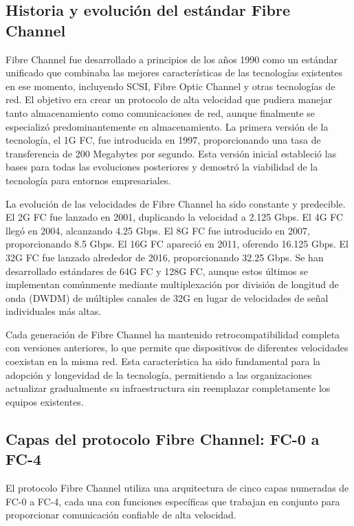 \subsection{Historia y evolución del estándar Fibre Channel}

Fibre Channel fue desarrollado a principios de los años 1990 como un estándar unificado que combinaba las mejores características de las tecnologías existentes en ese momento, incluyendo SCSI, Fibre Optic Channel y otras tecnologías de red. El objetivo era crear un protocolo de alta velocidad que pudiera manejar tanto almacenamiento como comunicaciones de red, aunque finalmente se especializó predominantemente en almacenamiento. La primera versión de la tecnología, el 1G FC, fue introducida en 1997, proporcionando una tasa de transferencia de 200 Megabytes por segundo. Esta versión inicial estableció las bases para todas las evoluciones posteriores y demostró la viabilidad de la tecnología para entornos empresariales.

La evolución de las velocidades de Fibre Channel ha sido constante y predecible. El 2G FC fue lanzado en 2001, duplicando la velocidad a 2.125 Gbps. El 4G FC llegó en 2004, alcanzando 4.25 Gbps. El 8G FC fue introducido en 2007, proporcionando 8.5 Gbps. El 16G FC apareció en 2011, oferendo 16.125 Gbps. El 32G FC fue lanzado alrededor de 2016, proporcionando 32.25 Gbps. Se han desarrollado estándares de 64G FC y 128G FC, aunque estos últimos se implementan comúnmente mediante multiplexación por división de longitud de onda (DWDM) de múltiples canales de 32G en lugar de velocidades de señal individuales más altas.

Cada generación de Fibre Channel ha mantenido retrocompatibilidad completa con versiones anteriores, lo que permite que dispositivos de diferentes velocidades coexistan en la misma red. Esta característica ha sido fundamental para la adopción y longevidad de la tecnología, permitiendo a las organizaciones actualizar gradualmente su infraestructura sin reemplazar completamente los equipos existentes.

\subsection{Capas del protocolo Fibre Channel: FC-0 a FC-4}

El protocolo Fibre Channel utiliza una arquitectura de cinco capas numeradas de FC-0 a FC-4, cada una con funciones específicas que trabajan en conjunto para proporcionar comunicación confiable de alta velocidad.


